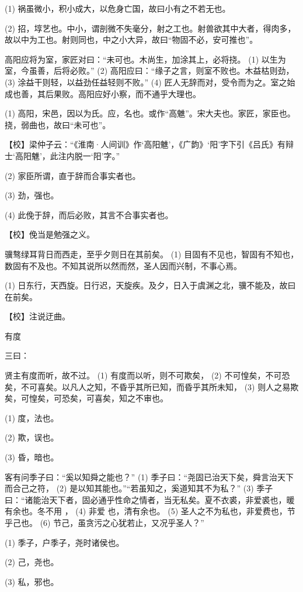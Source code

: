 \documentclass[12pt,UTF8]{ctexbook}
\begin{document}
(1) 祸虽微小，积小成大，以危身亡国，故曰小有之不若无也。

(2) 招，埻艺也。中小，谓剖微不失毫分，射之工也。射兽欲其中大者，得肉多，故以中为工也。射则同也，中之小大异，故曰“物固不必，安可推也”。

高阳应将为室，家匠对曰：“未可也。木尚生，加涂其上，必将挠。 (1) 以生为室，今虽善，后将必败。” (2) 高阳应曰：“缘子之言，则室不败也。木益枯则劲， (3) 涂益干则轻，以益劲任益轻则不败。” (4) 匠人无辞而对，受令而为之。室之始成也善，其后果败。高阳应好小察，而不通乎大理也。

(1) 高阳，宋邑，因以为氏。应，名也。或作“高魋”。宋大夫也。家匠，家臣也。挠，弱曲也，故曰“未可也”。

【校】梁仲子云：“《淮南·人间训》作‘高阳魋’，《广韵》‘阳’字下引《吕氏》有辩士‘高阳魋’，此注内脱一‘阳’字。”

(2) 家臣所谓，直于辞而合事实者也。

(3) 劲，强也。

(4) 此俛于辞，而后必败，其言不合事实者也。

【校】俛当是勉强之义。

骥骜绿耳背日而西走，至乎夕则日在其前矣。 (1) 目固有不见也，智固有不知也，数固有不及也。不知其说所以然而然，圣人因而兴制，不事心焉。

(1) 日东行，天西旋。日行迟，天旋疾。及夕，日入于虞渊之北，骥不能及，故曰在前矣。

【校】注说迂曲。





有度


三曰：

贤主有度而听，故不过。 (1) 有度而以听，则不可欺矣， (2) 不可惶矣，不可恐矣，不可喜矣。以凡人之知，不昏乎其所已知，而昏乎其所未知， (3) 则人之易欺矣，可惶矣，可恐矣，可喜矣，知之不审也。

(1) 度，法也。

(2) 欺，误也。

(3) 昏，暗也。

客有问季子曰：“奚以知舜之能也？” (1) 季子曰：“尧固已治天下矣，舜言治天下而合己之符， (2) 是以知其能也。”“若虽知之，奚道知其不为私？” (3) 季子曰：“诸能治天下者，固必通乎性命之情者，当无私矣。夏不衣裘，非爱裘也，暖有余也。冬不用 ， (4) 非爱 也，清有余也。 (5) 圣人之不为私也，非爱费也，节乎己也。 (6) 节己，虽贪污之心犹若止，又况乎圣人？”

(1) 季子，户季子，尧时诸侯也。

(2) 己，尧也。

(3) 私，邪也。
\end{document}
